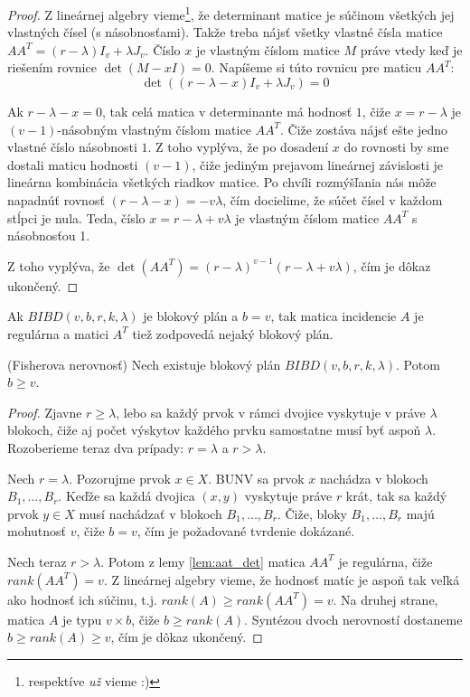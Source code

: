 \begin{proof}
Z lineárnej algebry vieme\footnote{respektíve \emph{už} vieme :)}, že determinant matice je súčinom všetkých jej vlastných čísel (s násobnosťami).
Takže treba nájsť všetky vlastné čísla matice $A A^T = (r-\lambda) I_v + \lambda J_{v}$.
Číslo $x$ je vlastným číslom matice $M$ práve vtedy keď je riešením rovnice $\det(M - xI) = 0$.
Napíšeme si túto rovnicu pre maticu $AA^T$:
$$\det((r-\lambda - x) I_v + \lambda J_{v}) = 0$$

Ak $r-\lambda - x = 0$, tak celá matica v determinante má hodnosť $1$, čiže $x = r - \lambda$ je $(v-1)$-násobným vlastným číslom matice $AA^T$. 
Čiže zostáva nájsť ešte jedno vlastné číslo násobnosti $1$.
Z toho vyplýva, že po dosadení $x$ do rovnosti by sme dostali maticu hodnosti $(v-1)$, čiže jediným prejavom lineárnej závislosti je lineárna kombinácia všetkých riadkov matice.
Po chvíli rozmýšľania nás môže napadnúť rovnosť $(r - \lambda - x) = - v \lambda$, čím docielime, že súčet čísel v každom stĺpci je nula.
Teda, číslo $x =r - \lambda + v\lambda $ je vlastným číslom matice $A A^T$ s násobnosťou 1.

Z toho vyplýva, že $\det(AA^T) = (r - \lambda)^{v-1}(r - \lambda + v \lambda)$, čím je dôkaz ukončený.
\end{proof}

\begin{corollary}
Ak $BIBD(v, b,r, k, \lambda)$ je blokový plán a $b=v$, tak matica incidencie $A$ je regulárna a matici $A^T$ tiež zodpovedá nejaký blokový plán.
\end{corollary}


\begin{theorem}{(Fisherova nerovnosť)}
Nech existuje blokový plán $BIBD(v, b,r, k, \lambda)$. Potom $b \geq v$.
\end{theorem}


\begin{proof}
Zjavne $r \geq \lambda$, lebo sa každý prvok v rámci dvojice vyskytuje v práve $\lambda$ blokoch, čiže aj počet výskytov každého prvku samostatne musí byť aspoň $\lambda$.
Rozoberieme teraz dva prípady: $r = \lambda$ a $r > \lambda$.

Nech $r = \lambda$. 
Pozorujme prvok $x \in X$.
BUNV sa prvok $x$ nachádza v blokoch $B_1, \ldots, B_r$.
Keďže sa každá dvojica $(x, y)$ vyskytuje práve $r$ krát, tak sa každý prvok $y \in X$ musí nachádzať v blokoch $B_1, \ldots, B_r$.
Čiže, bloky $B_1, \ldots, B_r$ majú mohutnosť $v$, čiže $b = v$, čím je požadované tvrdenie dokázané.

Nech teraz $r > \lambda$.
Potom z lemy \ref{lem:aat_det} matica $AA^T$ je regulárna, čiže $rank(AA^T) = v$.
Z lineárnej algebry vieme, že hodnosť matíc je aspoň tak veľká ako hodnosť ich súčinu, t.j. $rank(A) \geq rank(AA^T) = v$.
Na druhej strane, matica $A$ je typu $v \times b$, čiže $b \geq rank(A)$.
Syntézou dvoch nerovností dostaneme $b \geq rank(A) \geq v$, čím je dôkaz ukončený.
\end{proof}


